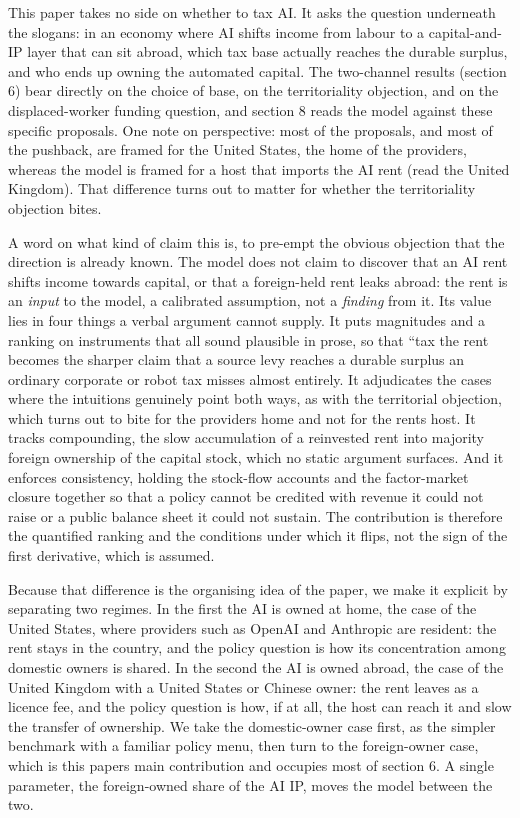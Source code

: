 \documentclass[11pt]{article}
\begin{document}
This paper takes no side on whether to tax AI. It asks the question
underneath the slogans: in an economy where AI shifts income from labour
to a capital-and-IP layer that can sit abroad, which tax base actually
reaches the durable surplus, and who ends up owning the automated
capital. The two-channel results (section 6) bear directly on the choice
of base, on the territoriality objection, and on the displaced-worker
funding question, and section 8 reads the model against these specific
proposals. One note on perspective: most of the proposals, and most of
the pushback, are framed for the United States, the home of the
providers, whereas the model is framed for a host that imports the AI
rent (read the United Kingdom). That difference turns out to matter for
whether the territoriality objection bites.

A word on what kind of claim this is, to pre-empt the obvious objection
that the direction is already known. The model does not claim to
discover that an AI rent shifts income towards capital, or that a
foreign-held rent leaks abroad: the rent is an \emph{input} to the
model, a calibrated assumption, not a \emph{finding} from it. Its value
lies in four things a verbal argument cannot supply. It puts magnitudes
and a ranking on instruments that all sound plausible in prose, so that
``tax the rent\textquotesingle\textquotesingle{} becomes the sharper
claim that a source levy reaches a durable surplus an ordinary corporate
or robot tax misses almost entirely. It adjudicates the cases where the
intuitions genuinely point both ways, as with the territorial objection,
which turns out to bite for the provider\textquotesingle s home and not
for the rent\textquotesingle s host. It tracks compounding, the slow
accumulation of a reinvested rent into majority foreign ownership of the
capital stock, which no static argument surfaces. And it enforces
consistency, holding the stock-flow accounts and the factor-market
closure together so that a policy cannot be credited with revenue it
could not raise or a public balance sheet it could not sustain. The
contribution is therefore the quantified ranking and the conditions
under which it flips, not the sign of the first derivative, which is
assumed.

Because that difference is the organising idea of the paper, we make it
explicit by separating two regimes. In the first the AI is owned at
home, the case of the United States, where providers such as OpenAI and
Anthropic are resident: the rent stays in the country, and the policy
question is how its concentration among domestic owners is shared. In
the second the AI is owned abroad, the case of the United Kingdom with a
United States or Chinese owner: the rent leaves as a licence fee, and
the policy question is how, if at all, the host can reach it and slow
the transfer of ownership. We take the domestic-owner case first, as the
simpler benchmark with a familiar policy menu, then turn to the
foreign-owner case, which is this paper\textquotesingle s main
contribution and occupies most of section 6. A single parameter, the
foreign-owned share of the AI IP, moves the model between the two.
\end{document}

